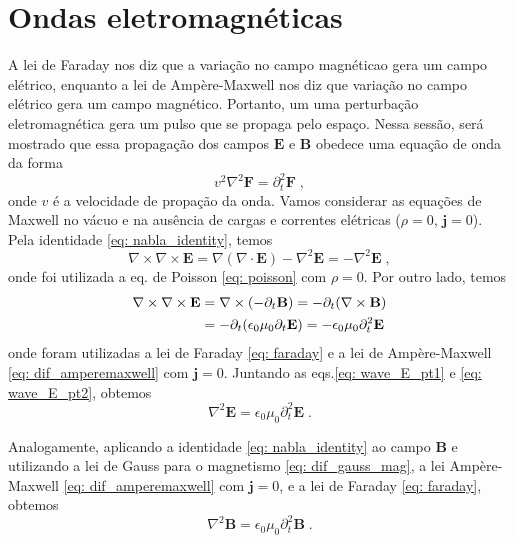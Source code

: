 \section{Ondas eletromagnéticas}

A lei de Faraday nos diz que a variação no campo magnéticao gera um campo elétrico, enquanto a lei de Ampère-Maxwell nos diz que variação no campo elétrico gera um campo magnético.
Portanto, um uma perturbação eletromagnética gera um pulso que se propaga pelo espaço.
Nessa sessão, será mostrado que essa propagação dos campos $\mathbf E$ e $\mathbf B$ obedece uma equação de onda da forma
\begin{equation}
    v^2 \nabla^2 \mathbf F = \partial_t^2 \mathbf F \;,
    \label{eq: wave}
\end{equation}
\noindent onde $v$ é a velocidade de propação da onda.
Vamos considerar as equações de Maxwell no vácuo e na ausência de cargas e correntes elétricas ($\rho = 0,\, \mathbf j = 0$).
Pela identidade \ref{eq: nabla_identity}, temos
\begin{equation}
    \nabla \times \nabla \times \mathbf E = \nabla (\nabla \cdot \mathbf E) - \nabla^2 \mathbf E = -\nabla^2 \mathbf E \;,
    \label{eq: wave_E_pt1}
\end{equation}
\noindent onde foi utilizada a eq. de Poisson \eqref{eq: poisson} com $\rho = 0$. Por outro lado, temos
\begin{align}
    \nabla \times \nabla \times \mathbf E &= \nabla \times (-\partial_t \mathbf B) = -\partial_t (\nabla \times \mathbf B) \notag \\
    &= -\partial_t (\epsilon_0\mu_0\partial_t \mathbf E) = -\epsilon_0\mu_0\partial_t^2 \mathbf E
    \label{eq: wave_E_pt2}
\end{align}
\noindent onde foram utilizadas a lei de Faraday \eqref{eq: faraday} e a lei de Ampère-Maxwell \eqref{eq: dif_amperemaxwell} com $\mathbf j = 0$.
Juntando as eqs.\eqref{eq: wave_E_pt1} e \eqref{eq: wave_E_pt2}, obtemos
\begin{equation}
    \nabla^2 \mathbf E = \epsilon_0\mu_0\partial_t^2 \mathbf E \;.
    \label{eq: wave_E}
\end{equation}

Analogamente, aplicando a identidade \ref{eq: nabla_identity} ao campo $\mathbf B$ e utilizando a lei de Gauss para o magnetismo \eqref{eq: dif_gauss_mag}, a lei Ampère-Maxwell \eqref{eq: dif_amperemaxwell} com $\mathbf j = 0$, e a lei de Faraday \eqref{eq: faraday}, obtemos
\begin{equation}
    \nabla^2 \mathbf B = \epsilon_0\mu_0\partial_t^2 \mathbf B \;.
    \label{eq: wave_B}
\end{equation}

